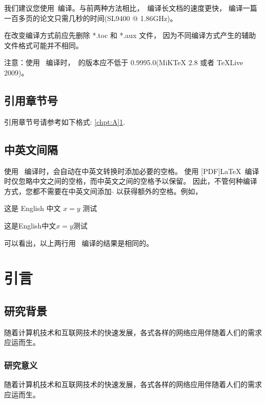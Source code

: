 我们建议您使用\XeLaTeX\ 编译。与前两种方法相比，\XeLaTeX\  编译长文档的速度更快，
编译一篇一百多页的论文只需几秒的时间(SL9400 @ 1.86GHz)。

在改变编译方式前应先删除 *.toc 和 *.aux 文件，
因为不同编译方式产生的辅助文件格式可能并不相同。

注意：使用 \XeLaTeX\ 编译时，\XeTeX\ 的版本应不低于 0.9995.0(MiKTeX 2.8 或者 TeXLive 2009)。


\section{引用章节号}
\label{sec:ex:A}

引用章节号请参考如下格式: \ref{chpt:A}\ref{sec:ex:A}.


\section{中英文间隔}

使用 \XeLaTeX\ 编译时，会自动在中英文转换时添加必要的空格。 使用 [PDF]\LaTeX\
编译时仅忽略中文之间的空格，而中英文之间的空格予以保留。
因此，不管何种编译方式，您都不需要在中英文间添加 $\tilde{}$ 以获得额外的空格。例如，

这是 English 中文 $x=y$ 测试

这是English中文$x=y$测试

可以看出，以上两行用 \XeLaTeX\ 编译的结果是相同的。




\chapter{引言}

\section{研究背景}

随着计算机技术和互联网技术的快速发展\cite{Nadkarni-1992}，各式各样的网络应用伴随着人们的需求应运而生\cite{Hua-Wang-1973}。

\subsection{研究意义}

随着计算机技术和互联网技术的快速发展\cite{Nadkarni-1992}，各式各样的网络应用伴随着人们的需求应运而生\cite{Hua-Wang-1973}。

